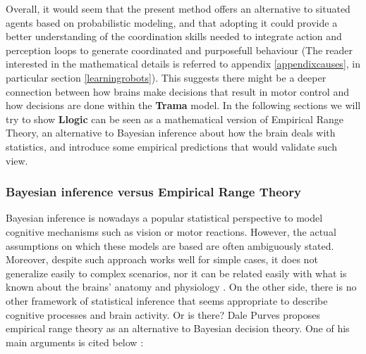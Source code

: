 \documentclass[
		twoside,openright,titlepage,numbers=noenddot,manychapters,
		headinclude,%
                footinclude=false,cleardoublepage=empty,
                BCOR=5mm,
		fontsize=11pt, %
                 enabledeprecatedfontcommands]{scrreprt}
\begin{document}
Overall, it would seem that the present method offers an alternative to situated agents based on probabilistic modeling, and that adopting it could provide a better understanding of the coordination skills needed to integrate action and perception loops to generate coordinated and purposefull behaviour (The reader interested in the mathematical details is referred to appendix  \ref{appendixcauses},  in particular section \ref{learningrobots}).
This suggests there might be a deeper connection between how brains make decisions that result in motor control and how decisions are done within the \textbf{Trama} model. In the following sections we will try to show  \textbf{Llogic} can be seen as a mathematical version of Empirical Range Theory, an alternative to Bayesian inference about how the brain deals with statistics, and introduce some empirical predictions that would validate such view.


\subsubsection{Bayesian inference versus Empirical Range Theory}

Bayesian inference is nowadays a popular statistical perspective to model cognitive mechanisms such as vision or motor reactions. However, the actual assumptions on which these models are based are often ambiguously stated. Moreover, despite such approach works well for simple cases, it does not generalize easily to complex scenarios, nor it can be related easily with what is known about the brains' anatomy and physiology  \cite[]{jones2011}.  On the other side, there is no other framework of statistical inference that seems appropriate to describe cognitive processes and brain activity. Or is there? Dale Purves proposes empirical range theory as an alternative to Bayesian decision theory.  One of his main arguments is cited below \cite[page 228]{purves}:
\end{document}

